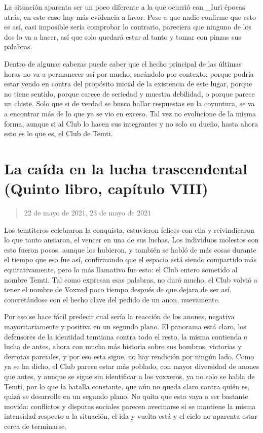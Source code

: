 \documentclass[
]{book}
\begin{document}
La situación aparenta ser un poco diferente a la que ocurrió con \_Iuri épocas atrás, en este caso hay más evidencia a favor. Pese a que nadie confirme que esto es así, casi imposible sería comprobar lo contrario, pareciera que ninguno de los dos lo va a hacer, así que solo quedará estar al tanto y tomar con pinzas sus palabras.

Dentro de algunas cabezas puede caber que el hecho principal de las últimas horas no va a permanecer así por mucho, sacándolo por contexto: porque podría estar yendo en contra del propósito inicial de la existencia de este lugar, porque no tiene sentido, porque carece de seriedad y muestra debilidad, o porque parece un chiste. Solo que si de verdad se busca hallar respuestas en la coyuntura, se va a encontrar más de lo que ya se vio en exceso. Tal vez no evolucione de la misma forma, aunque si al Club lo hacen sus integrantes y no solo su dueño, hasta ahora esto es lo que es, el Club de Temti.

\hypertarget{la-cauxedda-en-la-lucha-trascendental-quinto-libro-capuxedtulo-viii}{%
\section{La caída en la lucha trascendental (Quinto libro, capítulo VIII)}\label{la-cauxedda-en-la-lucha-trascendental-quinto-libro-capuxedtulo-viii}}

\begin{quote}
22 de mayo de 2021, 23 de mayo de 2021
\end{quote}

Los temtiteros celebraron la conquista, estuvieron felices con ella y reivindicaron lo que tanto ansiaron, el vencer en una de sus luchas. Los individuos molestos con esto fueron pocos, aunque los hubieron, y también se habló de más cosas durante el tiempo que eso fue así, confirmando que el espacio está siendo compartido más equitativamente, pero lo más llamativo fue esto: el Club entero sometido al nombre Temti. Tal como expresan esas palabras, no duró mucho, el Club volvió a tener el nombre de Voxxed poco tiempo después de que dejara de ser así, concretándose con el hecho clave del pedido de un anon, nuevamente.

Por eso se hace fácil predecir cual sería la reacción de los anones, negativa mayoritariamente y positiva en un segundo plano. El panorama está claro, los defensores de la identidad temtiana contra todo el resto, la misma contienda o lucha de antes, ahora con mucha más historia sobre sus hombros, victorias y derrotas parciales, y por eso esta sigue, no hay rendición por ningún lado. Como ya se ha dicho, el Club parece estar más poblado, con mayor diversidad de anones que antes, y aunque se sigue sin identificar a los voxxeros, ya no solo se habla de Temti, por lo que la batalla constante, que aún no queda claro contra quién es, quizá se desarrolle en un segundo plano. No quita que esta vaya a ser bastante movida: conflictos y disputas sociales parecen avecinarse si se mantiene la misma intensidad respecto a la situación, el ida y vuelta está y el ciclo no aparenta estar cerca de terminarse.
\end{document}
